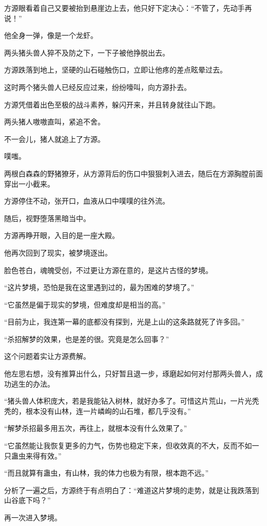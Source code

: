 \begin{this_body}
方源眼看着自己又要被抬到悬崖边上去，他只好下定决心：“不管了，先动手再说！”

他全身一弹，像是一个龙虾。

两头猪头兽人猝不及防之下，一下子被他挣脱出去。

方源跌落到地上，坚硬的山石碰触伤口，立即让他疼的差点眩晕过去。

这时两个猪头兽人已经反应过来，纷纷嚎叫，向方源扑去。

方源凭借着出色至极的战斗素养，躲闪开来，并且转身就往山下跑。

两头猪人嗷嗷直叫，紧追不舍。

不一会儿，猪人就追上了方源。

噗嗤。

两根白森森的野猪獠牙，从方源背后的伤口中狠狠刺入进去，随后在方源胸膛前面穿出一小截来。

方源停住不动，张开口，血液从口中噗噗的往外流。

随后，视野堕落黑暗当中。

方源再睁开眼，入目的是一座大殿。

他再次回到了现实，被梦境逐出。

脸色苍白，魂魄受创，不过更让方源在意的，是这片古怪的梦境。

“这片梦境，恐怕是我在这里遇到过的，最为困难的梦境了。”

“它虽然是偏于现实的梦境，但难度却是相当的高。”

“目前为止，我连第一幕的底都没有探到，光是上山的这条路就死了许多回。”

“杀招解梦的效果，也是差的很。究竟是怎么回事？”

这个问题着实让方源费解。

他左思右想，没有推算出什么，只好暂且退一步，琢磨起如何对付那两头兽人，成功逃生的办法。

“猪头兽人体积庞大，若是我能钻入树林，就好办多了。可惜这片荒山，一片光秃秃的，根本没有山林，连一片嶙峋的山石堆，都几乎没有。”

“解梦杀招最多用五次，再往上，就根本没有什么效果了。”

“它虽然能让我恢复更多的力气，伤势也稳定下来，但收效真的不大，反而不如一只蛊虫来得有效。”

“而且就算有蛊虫，有山林，我的体力也极为有限，根本跑不远。”

分析了一遍之后，方源终于有点明白了：“难道这片梦境的走势，就是让我跌落到山谷底下吗？”

再一次进入梦境。


\end{this_body}
